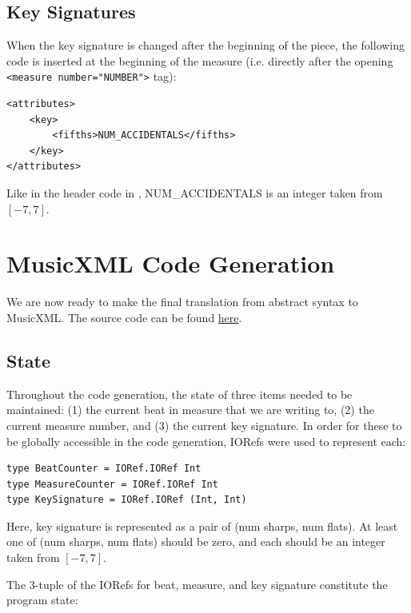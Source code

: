 \documentclass{report}
\begin{document}
\subsection{Key Signatures}
\label{sec:xmlkeysig}
When the  key signature is changed after the beginning of the piece, the following  code is inserted at the beginning of the measure (i.e. directly after the opening \verb.<measure number="NUMBER">. tag):

\begin{verbatim}
<attributes>
    <key>
        <fifths>NUM_ACCIDENTALS</fifths>
    </key>
</attributes>
\end{verbatim}

Like in the header code in , NUM\_ACCIDENTALS is an integer taken from $[-7,7]$.

\section{MusicXML Code Generation}
We are now ready to make the final translation from abstract syntax to MusicXML. The source code can be found \href{https://github.com/ilanashapiro/MusAssist/blob/main/app/MusicXMLgen.hs}{here}.

\subsection{State}
Throughout the code generation, the state of three items needed to be maintained: (1) the current beat in measure that we are writing to, (2) the current measure number, and (3) the current key signature. In order for these to be globally accessible in the code generation, IORefs were used to represent each:
\begin{verbatim}
type BeatCounter = IORef.IORef Int
type MeasureCounter = IORef.IORef Int
type KeySignature = IORef.IORef (Int, Int)
\end{verbatim}

Here, key signature is represented as a pair of (num sharps, num flats). At least one of (num sharps, num flats) should be zero, and each should be an integer taken from $[-7,7]$. 

\noindent The 3-tuple of the IORefs for beat, measure, and key signature constitute the program state: 
\end{document}
